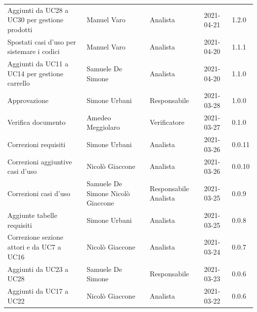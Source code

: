 \documentclass[a4paper]{article}
\begin{document}
\begin{center}
\begin{longtable}[!h]{p{160px} p{90px} p{60px} p{60px} p{50px}}
        Aggiunti da UC28 a UC30 per gestione prodotti            & Manuel Varo                                & Analista                       & 2021-04-21    & 1.2.0             \\
        Spostati casi d'uso per sistemare i codici               & Manuel Varo                                & Analista                       & 2021-04-20    & 1.1.1             \\
        Aggiunti da UC11 a UC14 per gestione carrello            & Samuele De Simone                          & Analista                       & 2021-04-20    & 1.1.0             \\
        Approvazione                                             & Simone Urbani                              & Responsabile                   & 2021-03-28    & 1.0.0             \\
        Verifica documento                                       & Amedeo Meggiolaro                          & Verificatore                   & 2021-03-27    & 0.1.0             \\
        Correzioni requisiti                                     & Simone Urbani                              & Analista                       & 2021-03-26    & 0.0.11            \\
        Correzioni aggiuntive casi d'uso                         & Nicolò Giaccone                            & Analista                       & 2021-03-26    & 0.0.10            \\
        Correzioni casi d'uso                                    & Samuele De Simone \newline Nicolò Giaccone & Responsabile \newline Analista & 2021-03-25    & 0.0.9             \\
        Aggiunte tabelle requisiti                               & Simone Urbani                              & Analista                       & 2021-03-25    & 0.0.8             \\
        Correzione sezione attori e da UC7 a UC16                & Nicolò Giaccone                            & Analista                       & 2021-03-24    & 0.0.7             \\
        Aggiunti da UC23 a UC28                                  & Samuele De Simone                          & Responsabile                   & 2021-03-23    & 0.0.6             \\
        Aggiunti da UC17 a UC22                                  & Nicolò Giaccone                            & Analista                       & 2021-03-22    & 0.0.6             \\

\end{longtable}
\end{center}
\end{document}
